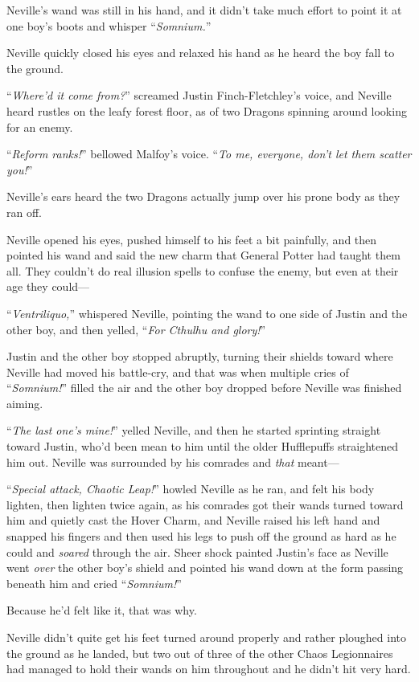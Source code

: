 Neville’s wand was still in his hand, and it didn’t take much effort to point it at one boy’s boots and whisper “\emph{Somnium.}”

Neville quickly closed his eyes and relaxed his hand as he heard the boy fall to the ground.

“\emph{Where’d it come from?}” screamed Justin Finch-Fletchley’s voice, and Neville heard rustles on the leafy forest floor, as of two Dragons spinning around looking for an enemy.

“\emph{Reform ranks!}” bellowed Malfoy’s voice. “\emph{To me, everyone, don’t let them scatter you!}”

Neville’s ears heard the two Dragons actually jump over his prone body as they ran off.

Neville opened his eyes, pushed himself to his feet a bit painfully, and then pointed his wand and said the new charm that General Potter had taught them all. They couldn’t do real illusion spells to confuse the enemy, but even at their age they could—

“\emph{Ventriliquo,}” whispered Neville, pointing the wand to one side of Justin and the other boy, and then yelled, “\emph{For Cthulhu and glory!}”

Justin and the other boy stopped abruptly, turning their shields toward where Neville had moved his battle-cry, and that was when multiple cries of “\emph{Somnium!}” filled the air and the other boy dropped before Neville was finished aiming.

“\emph{The last one’s mine!}” yelled Neville, and then he started sprinting straight toward Justin, who’d been mean to him until the older Hufflepuffs straightened him out. Neville was surrounded by his comrades and \emph{that} meant—

“\emph{Special attack, Chaotic Leap!}” howled Neville as he ran, and felt his body lighten, then lighten twice again, as his comrades got their wands turned toward him and quietly cast the Hover Charm, and Neville raised his left hand and snapped his fingers and then used his legs to push off the ground as hard as he could and \emph{soared} through the air. Sheer shock painted Justin’s face as Neville went \emph{over} the other boy’s shield and pointed his wand down at the form passing beneath him and cried “\emph{Somnium!}”

Because he’d felt like it, that was why.

Neville didn’t quite get his feet turned around properly and rather ploughed into the ground as he landed, but two out of three of the other Chaos Legionnaires had managed to hold their wands on him throughout and he didn’t hit very hard.

